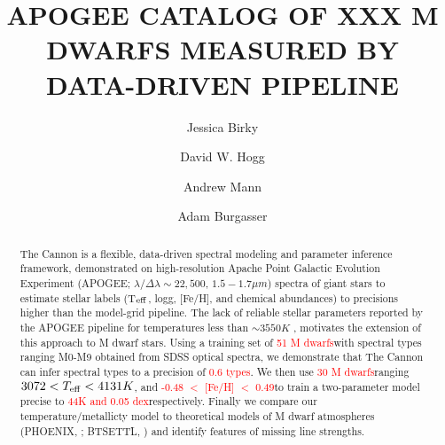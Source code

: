 \documentclass[modern]{aastex62}
\begin{document}
\title{APOGEE CATALOG OF XXX M DWARFS MEASURED BY DATA-DRIVEN PIPELINE}


\author[0000-0002-7961-6881]{Jessica Birky}

\author[0000-0003-2866-9403]{David W. Hogg}

\author[0000-0003-3654-1602]{Andrew Mann}

\author[0000-0002-6523-9536]{Adam Burgasser}

\begin{abstract}

The Cannon \citep{Ness:2015} is a flexible, data-driven spectral modeling and parameter inference framework, demonstrated on high-resolution Apache Point Galactic Evolution Experiment (APOGEE; $\lambda/\Delta\lambda\sim22,500$, $1.5-1.7 \mu m$) spectra of giant stars to estimate stellar labels (T$_{\rm eff}$, logg, [Fe/H], and chemical abundances) to precisions higher than the model-grid pipeline. The lack of reliable stellar parameters reported by the APOGEE pipeline for temperatures less than $\sim3550K$ \citep{Schmidt:2016}, motivates the extension of this approach to M dwarf stars. Using a training set of \textcolor{red}{51 M dwarfs}\textcolor{black} with spectral types ranging M0-M9 obtained from SDSS optical spectra, we demonstrate that The Cannon can infer spectral types to a precision of \textcolor{red}{0.6 types}\textcolor{black}. We then use \textcolor{red}{30 M dwarfs}\textcolor{black} ranging \textcolor{red}{$3072 < T_{\rm eff} < 4131K$}\textcolor{black}, and \textcolor{red}{-0.48 $<$ [Fe/H] $<$ 0.49}\textcolor{black} to train a two-parameter model precise to \textcolor{red}{44K and 0.05 dex}\textcolor{black} respectively. Finally we compare our temperature/metallicty model to theoretical models of M dwarf atmospheres (PHOENIX, \citealt{Husser:2013}; BTSETTL, \citealt{Allard:2011}) and identify features of missing line strengths.

\end{abstract}
\end{document}
